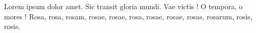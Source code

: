 \documentclass{article}
\begin{document}
\beginnumbering

\pstart
{}Lorem ipsum dolor amet\linenumannotation{}. Sic transit gloria mundi. Vae victis ! O tempora, o mores ! Rosa, rosa, rosam, rosae, rosae, rosa, rosae, rosae, rosas, rosarum, rosis, rosis.
\pend
\endnumbering
\end{document}

